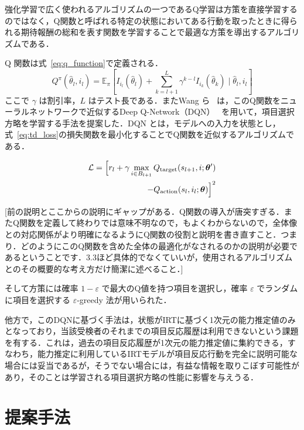 \documentclass[dvipdfmx,a4j]{jarticle}
\begin{document}
強化学習で広く使われるアルゴリズムの一つであるQ学習は方策を直接学習するのではなく，Q関数と呼ばれる特定の状態においてある行動を取ったときに得られる期待報酬の総和を表す関数を学習することで最適な方策を導出するアルゴリズムである．

Q 関数は式~\eqref{eq:q_function}で定義される．
\begin{equation}
Q^\pi(\hat{\theta}_l, i_l)
= \mathbb{E}_\pi \left[
I_{i_l}(\hat{\theta}_l)
+ \sum_{k=l+1}^{L} \gamma^{k-l} I_{i_k}(\hat{\theta}_k)
\mid \hat{\theta}_l, i_l
\right]
\label{eq:q_function}
\end{equation}
ここで $\gamma$ は割引率，$L$ はテスト長である．またWang ら~\cite{wang2024} は，このQ関数をニューラルネットワークで近似するDeep Q-Network（DQN）~\cite{mnih2015} を用いて，項目選択方略を学習する手法を提案した．DQN とは，モデルへの入力を状態とし，式~\eqref{eq:td_loss}の損失関数を最小化することでQ関数を近似するアルゴリズムである．

\begin{align}
\mathcal{L}
= \Bigl[
r_l + \gamma \max_{i \in B_{l+1}} Q_{\mathrm{target}}(s_{l+1}, i; \bm{\theta}') \notag\\
- Q_{\mathrm{action}}(s_l, i_l; \bm{\theta})
\Bigr]^2
\label{eq:td_loss}
\end{align}

{\color{red}
[前の説明とここからの説明にギャップがある．Q関数の導入が唐突すぎる．またQ関数を定義して終わりでは意味不明なので，もよくわからないので，全体像との対応関係がより明確になるようにQ関数の役割と説明を書き直すこと．つまり．どのようにこのQ関数を含めた全体の最適化がなされるのかの説明が必要であるということです．3.3ほど具体的でなくていいが，使用されるアルゴリズムとのその概要的な考え方だけ簡潔に述べること．]
}

そして方策には確率 $1-\varepsilon$ で最大のQ値を持つ項目を選択し，確率 $\varepsilon$ でランダムに項目を選択する $\varepsilon$-greedy 法が用いられた．

他方で，このDQNに基づく手法は，状態がIRTに基づく1次元の能力推定値のみとなっており，当該受検者のそれまでの項目反応履歴は利用できないという課題を有する．これは，過去の項目反応履歴が1次元の能力推定値に集約できる，すなわち，能力推定に利用しているIRTモデルが項目反応行動を完全に説明可能な場合には妥当であるが，そうでない場合には，有益な情報を取りこぼす可能性があり，そのことは学習される項目選択方略の性能に影響を与えうる．

\section{提案手法}
\end{document}
